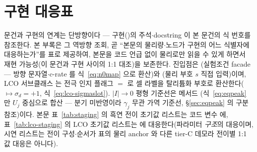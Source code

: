 \section{구현 대응표}\label{sec:appendix-code}
문건과 구현의 연계는 단방향이다 --- 구현()의 주석$\cdot$docstring 이 본 문건의
식 번호를 참조한다. 본 부록은 그 역방향 조회, 곧 ``본문의 물리량$\cdot$노드가 구현의 어느 식별자에
대응하는가''를 표로 제공하여, 본문을 코드 언급 없이 물리로만 읽을 수 있게 하면서 재현 가능성(이 문건과
구현 사이의 1:1 대조)을 보존한다. 진입점은 (실험조건 facade --- 방향 문자열$\cdot$c-rate 를
식~\eqref{eq:n0map} 으로 환산)와 (물리 부호 $s$ 직접 입력)이며, LCO 서브클래스
 는 전극 인지 플래그 $=$ 로 셀 라벨을
탈리튬화 부호로 환산한다($\mapsto\sigma_d{=}+1$, 식~\eqref{eq:lco-sigmaslot}). $|I|\to0$
평형 기준선은 메서드 (식~\eqref{eq:eqpeak} 만 $U_j$ 중심으로 합산 --- 분기
미반영이라 $\gamma_j$ 무관 가역 기준선, \S\ref{sec:eqpeak} 의 구분 참조)이다. 본문 표~\ref{tab:staging} 의
흑연 전이 초기값 리스트는 코드 변수  에, 표~\ref{tab:lco-staging} 의 LCO
초기값 리스트는  에 대응한다(파라미터 \emph{구조}의 대응이며, 
시연 리스트는 전이 구성$\cdot$순서가 표의 물리 anchor 와 다른 tier-C 데모라 전이별 1:1 값 대응은 아니다).

